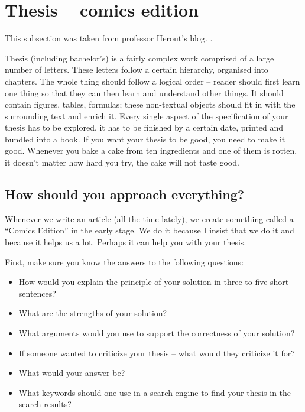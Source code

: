 \section{Thesis -- comics edition}

This subsection was taken from professor Herout's blog. \cite{Herout}.

Thesis (including bachelor's) is a fairly complex work comprised of a large number of letters. These letters follow a certain hierarchy, organised into chapters. The whole thing should follow a logical order -- reader should first learn one thing so that they can then learn and understand other things. It should contain figures, tables, formulas; these non-textual objects should fit in with the surrounding text and enrich it. Every single aspect of the specification of your thesis has to be explored, it has to be finished by a certain date, printed and bundled into a book. If you want your thesis to be good, you need to make it good. Whenever you bake a cake from ten ingredients and one of them is rotten, it doesn't matter how hard you try, the cake will not taste good.

\subsection{How should you approach everything?}

Whenever we write an article (all the time lately), we create something called a ``Comics Edition'' in the early stage. We do it because I insist that we do it and because it helps us a lot. Perhaps it can help you with your thesis.

First, make sure you know the answers to the following questions:
\begin{itemize}
  \item{How would you explain the principle of your solution in three to five short sentences?}
  \item{What are the strengths of your solution?}
  \item{What arguments would you use to support the correctness of your solution?}
  \item{If someone wanted to criticize your thesis -- what would they criticize it for?}
  \item{What would your answer be?}
  \item{What keywords should one use in a search engine to find your thesis in the search results?}
\end{itemize}

